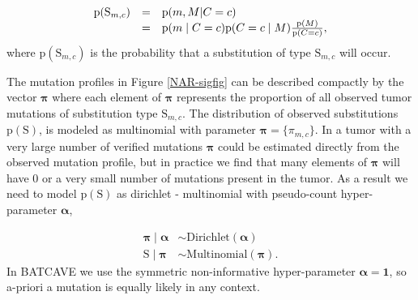 \documentclass[a4,center,fleqn]{NAR}
\newcommand{\batcave}{BATCAVE }
\begin{document}
\begin{equation}
  \label{eqn:detailed_prior}
  $$
  \begin{array}{rcl}
  \mathrm{p}(\mathrm{S}_{m,c}) &=&  \mathrm{p}(m, M | C = c) \\
                            &=& \mathrm{p}(m \mid C = c) \mathrm{p}(C = c \mid M)\frac{\mathrm{p}(M)}{\mathrm{p}(C = c)},
  \end{array}
  $$
\end{equation}
where $\mathrm{p}(\mathrm{S}_{m,c})$ is the probability that a substitution of type $\mathrm{S}_{m,c}$ will occur.



The mutation profiles in Figure \ref{NAR-sigfig} can be described compactly by the vector $\boldsymbol{\pi}$ where each element of $\boldsymbol{\pi}$ represents the proportion of all observed tumor mutations of substitution type $\mathrm{S}_{m,c}$.
The distribution of observed substitutions $ \mathrm{p}(\mathrm{S}) $, is modeled as multinomial with parameter $ \boldsymbol{ \pi } = \{\pi_{m,c}\} $.
In a tumor with a very large number of verified mutations $\boldsymbol{\pi}$ could be estimated directly from the observed mutation profile, but in practice we find that many elements of $\boldsymbol{\pi}$ will have $0$ or a very small number of mutations present in the tumor.
As a result we need to model $\mathrm{p}(\mathrm{S})$ as dirichlet - multinomial with pseudo-count hyper-parameter $\boldsymbol{\alpha}$, 

$$
\begin{aligned}
  \boldsymbol{\pi} \mid \boldsymbol{\alpha} &\sim \textrm{Dirichlet}(\boldsymbol{\alpha}) \\
  \mathrm{S} \mid \boldsymbol{\pi} & \sim \textrm{Multinomial}(\boldsymbol{\pi}).
\end{aligned}
$$
In \batcave we use the symmetric non-informative hyper-parameter $\boldsymbol{\alpha} = \boldsymbol{1}$, so a-priori a mutation is equally likely in any context.
\end{document}
